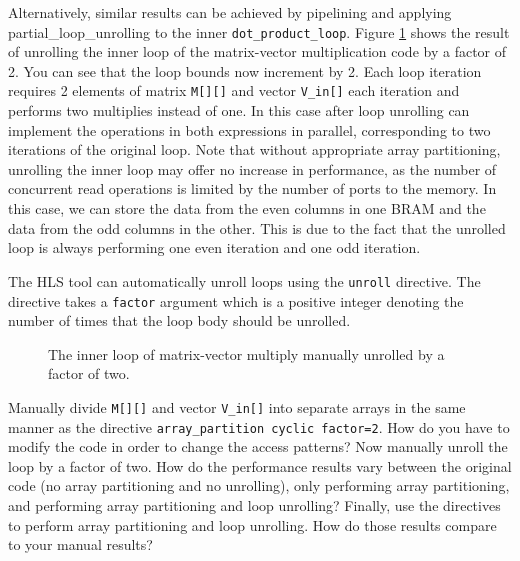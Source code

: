 Alternatively, similar results can be achieved by pipelining and applying \gls{partial_loop_unrolling} to the inner \lstinline|dot_product_loop|.   Figure \ref{fig:matrix_vector_unroll_inner2} shows the result of unrolling the inner loop of the matrix-vector multiplication code by a factor of 2. You can see that the loop bounds now increment by 2. Each loop iteration requires 2 elements of matrix \lstinline|M[][]| and vector \lstinline|V_in[]| each iteration and performs two multiplies instead of one. In this case after loop unrolling \VHLS can implement the operations in both expressions in parallel, corresponding to two iterations of the original loop. Note that without appropriate array partitioning, unrolling the inner loop may offer no increase in performance, as the number of concurrent read operations is limited by the number of ports to the memory.  In this case, we can store the data from the even columns in one BRAM and the data from the odd columns in the other. This is due to the fact that the unrolled loop is always performing one even iteration and one odd iteration. 

\begin{aside}
The HLS tool can automatically unroll loops using the \texttt{unroll} directive. The directive takes a \texttt{factor} argument which is a positive integer denoting the number of times that the loop body should be unrolled. 
\end{aside}

\begin{figure}

\caption{The inner loop of matrix-vector multiply manually unrolled by a factor of two. }
\label{fig:matrix_vector_unroll_inner2}
\end{figure}

\begin{exercise}
Manually divide \lstinline|M[][]| and vector \lstinline|V_in[]| into separate arrays in the same manner as the directive \lstinline|array_partition cyclic factor=2|. How do you have to modify the code in order to change the access patterns? Now manually unroll the loop by a factor of two. How do the performance results vary between the original code (no array partitioning and no unrolling), only performing array partitioning, and performing array partitioning and loop unrolling? Finally, use the directives to perform array partitioning and loop unrolling. How do those results compare to your manual results?
\end{exercise} 

